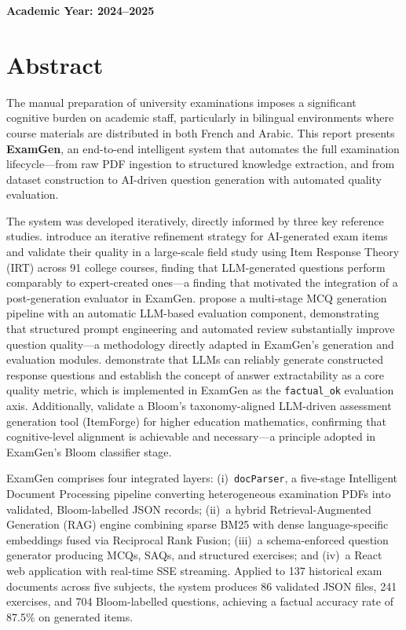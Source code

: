 \documentclass[12pt, a4paper]{article}
\begin{document}
\begin{center}
\vfill
{\bf Academic Year: 2024--2025}

\end{center}

\newpage
\thispagestyle{empty}

\section*{Abstract}

The manual preparation of university examinations imposes a significant cognitive
burden on academic staff, particularly in bilingual environments where course materials
are distributed in both French and Arabic. This report presents \textbf{ExamGen}, an
end-to-end intelligent system that automates the full examination lifecycle---from raw
PDF ingestion to structured knowledge extraction, and from dataset construction to
AI-driven question generation with automated quality evaluation.

The system was developed iteratively, directly informed by three key reference studies.
\citet{isley2025quality} introduce an iterative refinement strategy for AI-generated
exam items and validate their quality in a large-scale field study using Item Response
Theory (IRT) across 91 college courses, finding that LLM-generated questions perform
comparably to expert-created ones---a finding that motivated the integration of a
post-generation evaluator in ExamGen.
\citet{mucciaccia2025mcq} propose a multi-stage MCQ generation pipeline with an
automatic LLM-based evaluation component, demonstrating that structured prompt
engineering and automated review substantially improve question quality---a methodology
directly adapted in ExamGen's generation and evaluation modules.
\citet{morris2024aqg} demonstrate that LLMs can reliably generate constructed response
questions and establish the concept of answer extractability as a core quality metric,
which is implemented in ExamGen as the \texttt{factual\_ok} evaluation axis.
Additionally, \citet{meissner2024itemforge} validate a Bloom's taxonomy-aligned
LLM-driven assessment generation tool (ItemForge) for higher education mathematics,
confirming that cognitive-level alignment is achievable and necessary---a principle
adopted in ExamGen's Bloom classifier stage.

ExamGen comprises four integrated layers: (i)~\texttt{docParser}, a five-stage
Intelligent Document Processing pipeline converting heterogeneous examination PDFs
into validated, Bloom-labelled JSON records; (ii)~a hybrid Retrieval-Augmented
Generation (RAG) engine combining sparse BM25 with dense language-specific embeddings
fused via Reciprocal Rank Fusion; (iii)~a schema-enforced question generator producing
MCQs, SAQs, and structured exercises; and (iv)~a React web application with real-time
SSE streaming. Applied to 137 historical exam documents across five subjects, the system
produces 86 validated JSON files, 241 exercises, and 704 Bloom-labelled questions,
achieving a factual accuracy rate of 87.5\% on generated items.
\end{document}
